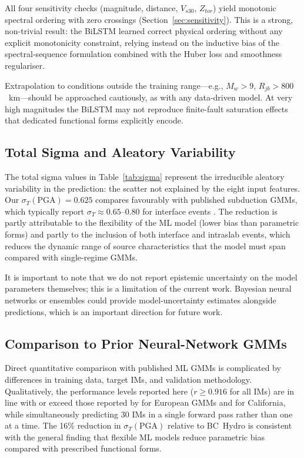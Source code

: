 \documentclass[12pt,a4paper]{article}
\begin{document}
All four sensitivity checks (magnitude, distance, $V_{s30}$, $Z_{tor}$) yield
monotonic spectral ordering with zero crossings (Section~\ref{sec:sensitivity}).
This is a strong, non-trivial result: the BiLSTM learned correct physical
ordering without any explicit monotonicity constraint, relying instead on the
inductive bias of the spectral-sequence formulation combined with the Huber
loss and smoothness regulariser.

Extrapolation to conditions outside the training range---e.g., $M_w > 9$,
$R_{jb} > 800$~km---should be approached cautiously, as with any data-driven
model.
At very high magnitudes the BiLSTM may not reproduce finite-fault saturation
effects that dedicated functional forms explicitly encode.

\subsection{Total Sigma and Aleatory Variability}

The total sigma values in Table~\ref{tab:sigma} represent the irreducible
aleatory variability in the prediction: the scatter not explained by the eight
input features.
Our $\sigma_T(\text{PGA}) = 0.625$ compares favourably with published
subduction GMMs, which typically report $\sigma_T \approx 0.65$--$0.80$ for
interface events \citep{Abrahamson2016,Zhao2006,Ghofrani2014}.
The reduction is partly attributable to the flexibility of the ML model
(lower bias than parametric forms) and partly to the inclusion of both
interface and intraslab events, which reduces the dynamic range of source
characteristics that the model must span compared with single-regime GMMs.

It is important to note that we do not report epistemic uncertainty on the
model parameters themselves; this is a limitation of the current work.
Bayesian neural networks or ensembles \citep{Lakshminarayanan2017} could
provide model-uncertainty estimates alongside predictions, which is an
important direction for future work.

\subsection{Comparison to Prior Neural-Network GMMs}

Direct quantitative comparison with published ML GMMs is complicated by
differences in training data, target IMs, and validation methodology.
Qualitatively, the performance levels reported here ($r \ge 0.916$ for all IMs)
are in line with or exceed those reported by \citet{Derras2014} for European
GMMs and \citet{Sahakian2018} for California, while simultaneously predicting
30 IMs in a single forward pass rather than one at a time.
The 16\% reduction in $\sigma_T(\text{PGA})$ relative to BC~Hydro
\citep{Abrahamson2016} is consistent with the general finding that flexible
ML models reduce parametric bias compared with prescribed functional forms.
\end{document}
